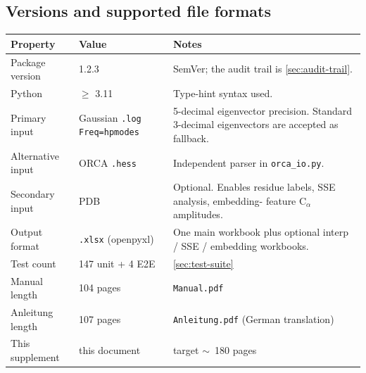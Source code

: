 \documentclass[10pt,a4paper,twoside]{article}
\newcommand{\file}[1]{\texttt{#1}}
\begin{document}
\subsection{Versions and supported file formats}

\begin{longtable}{p{} p{} p{}}
\toprule
\textbf{Property} & \textbf{Value} & \textbf{Notes} \\
\midrule
Package version           & 1.2.3              & SemVer; the audit trail
                                                  is \cref{sec:audit-trail}. \\
Python                    & $\geq$ 3.11        & Type-hint syntax used. \\
Primary input             & Gaussian \file{.log} \texttt{Freq=hpmodes}
                                              & 5-decimal eigenvector
                                                precision. Standard
                                                3-decimal eigenvectors
                                                are accepted as fallback. \\
Alternative input         & ORCA \file{.hess}  & Independent parser
                                                in \file{orca\_io.py}. \\
Secondary input           & PDB                & Optional. Enables
                                                residue labels,
                                                SSE analysis, embedding-
                                                feature C$_\alpha$
                                                amplitudes. \\
Output format             & \file{.xlsx} (openpyxl) & One main
                                                workbook plus optional
                                                interp / SSE /
                                                embedding workbooks. \\
Test count                & 147 unit + 4 E2E   & \cref{sec:test-suite} \\
Manual length             & 104 pages          & \file{Manual.pdf}\\
Anleitung length          & 107 pages          & \file{Anleitung.pdf}
                                                (German translation) \\
This supplement           & this document      & target \mbox{$\sim$}~180 pages \\
\bottomrule
\end{longtable}
\end{document}
